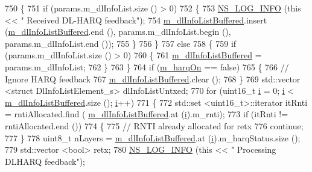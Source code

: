\begin{DoxyCode}
750     \{
751       \textcolor{keywordflow}{if} (params.m\_dlInfoList.size () > 0)
752         \{
753           \hyperlink{group__logging_gafbd73ee2cf9f26b319f49086d8e860fb}{NS\_LOG\_INFO} (\textcolor{keyword}{this} << \textcolor{stringliteral}{" Received DL-HARQ feedback"});
754           \hyperlink{classns3_1_1TtaFfMacScheduler_af7afa3d5a610456175b21bad17cc04ae}{m\_dlInfoListBuffered}.insert (\hyperlink{classns3_1_1TtaFfMacScheduler_af7afa3d5a610456175b21bad17cc04ae}{m\_dlInfoListBuffered}.end (),
       params.m\_dlInfoList.begin (), params.m\_dlInfoList.end ());
755         \}
756     \}
757   \textcolor{keywordflow}{else}
758     \{
759       \textcolor{keywordflow}{if} (params.m\_dlInfoList.size () > 0)
760         \{
761           \hyperlink{classns3_1_1TtaFfMacScheduler_af7afa3d5a610456175b21bad17cc04ae}{m\_dlInfoListBuffered} = params.m\_dlInfoList;
762         \}
763     \}
764   \textcolor{keywordflow}{if} (\hyperlink{classns3_1_1TtaFfMacScheduler_a08875f91819cf2e7cf2ed3781d36cda1}{m\_harqOn} == \textcolor{keyword}{false})
765     \{
766       \textcolor{comment}{// Ignore HARQ feedback}
767       \hyperlink{classns3_1_1TtaFfMacScheduler_af7afa3d5a610456175b21bad17cc04ae}{m\_dlInfoListBuffered}.clear ();
768     \}
769   std::vector <struct DlInfoListElement\_s> dlInfoListUntxed;
770   \textcolor{keywordflow}{for} (uint16\_t \hyperlink{bernuolliDistribution_8m_a6f6ccfcf58b31cb6412107d9d5281426}{i} = 0; \hyperlink{bernuolliDistribution_8m_a6f6ccfcf58b31cb6412107d9d5281426}{i} < \hyperlink{classns3_1_1TtaFfMacScheduler_af7afa3d5a610456175b21bad17cc04ae}{m\_dlInfoListBuffered}.size (); \hyperlink{bernuolliDistribution_8m_a6f6ccfcf58b31cb6412107d9d5281426}{i}++)
771     \{
772       std::set <uint16\_t>::iterator itRnti = rntiAllocated.find (
      \hyperlink{classns3_1_1TtaFfMacScheduler_af7afa3d5a610456175b21bad17cc04ae}{m\_dlInfoListBuffered}.at (\hyperlink{bernuolliDistribution_8m_a6f6ccfcf58b31cb6412107d9d5281426}{i}).m\_rnti);
773       \textcolor{keywordflow}{if} (itRnti != rntiAllocated.end ())
774         \{
775           \textcolor{comment}{// RNTI already allocated for retx}
776           \textcolor{keywordflow}{continue};
777         \}
778       uint8\_t nLayers = \hyperlink{classns3_1_1TtaFfMacScheduler_af7afa3d5a610456175b21bad17cc04ae}{m\_dlInfoListBuffered}.at (\hyperlink{bernuolliDistribution_8m_a6f6ccfcf58b31cb6412107d9d5281426}{i}).m\_harqStatus.size ();
779       std::vector <bool> retx;
780       \hyperlink{group__logging_gafbd73ee2cf9f26b319f49086d8e860fb}{NS\_LOG\_INFO} (\textcolor{keyword}{this} << \textcolor{stringliteral}{" Processing DLHARQ feedback"});

\end{DoxyCode}
